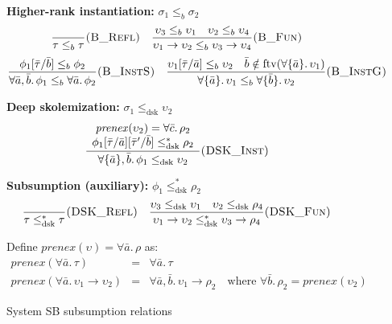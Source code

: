 \documentclass[11pt,a4paper]{article}
\begin{document}
\begin{figure}[p]
\centering
\textbf{Higher-rank instantiation:} $\boxed{\sigma_1 \leq_b \sigma_2}$
\[
\frac{}{\tau \leq_b \tau}\textsc{(B\_Refl)}
\quad
\frac{\upsilon_3 \leq_b \upsilon_1 \quad \upsilon_2 \leq_b \upsilon_4}{\upsilon_1 \to \upsilon_2 \leq_b \upsilon_3 \to \upsilon_4}\textsc{(B\_Fun)}
\]
\[
\frac{\phi_1[\bar{\tau}/\bar{b}] \leq_b \phi_2}{\forall \bar{a}, \bar{b}.\, \phi_1 \leq_b \forall \bar{a}.\, \phi_2}\textsc{(B\_InstS)}
\quad
\frac{\upsilon_1[\bar{\tau}/\bar{a}] \leq_b \upsilon_2 \quad \bar{b} \notin \mathrm{ftv}(\forall\{\bar{a}\}.\, \upsilon_1)}{\forall\{\bar{a}\}.\, \upsilon_1 \leq_b \forall\{\bar{b}\}.\, \upsilon_2}\textsc{(B\_InstG)}
\]

\vspace{1em}
\textbf{Deep skolemization:} $\boxed{\sigma_1 \leq_{\mathrm{dsk}} \upsilon_2}$
\[
\frac{\begin{array}{c}
\mathit{prenex}(\upsilon_2) = \forall \bar{c}.\, \rho_2 \\
\phi_1[\bar{\tau}/\bar{a}][\bar{\tau}'/\bar{b}] \leq_{\mathrm{dsk}}^{*} \rho_2
\end{array}}{\forall\{\bar{a}\}, \bar{b}.\, \phi_1 \leq_{\mathrm{dsk}} \upsilon_2}\textsc{(DSK\_Inst)}
\]

\vspace{0.5em}
\textbf{Subsumption (auxiliary):} $\boxed{\phi_1 \leq_{\mathrm{dsk}}^{*} \rho_2}$
\[
\frac{}{\tau \leq_{\mathrm{dsk}}^{*} \tau}\textsc{(DSK\_Refl)}
\quad
\frac{\upsilon_3 \leq_{\mathrm{dsk}} \upsilon_1 \quad \upsilon_2 \leq_{\mathrm{dsk}} \rho_4}{\upsilon_1 \to \upsilon_2 \leq_{\mathrm{dsk}}^{*} \upsilon_3 \to \rho_4}\textsc{(DSK\_Fun)}
\]

\vspace{0.5em}
Define $\mathit{prenex}(\upsilon) = \forall \bar{a}.\, \rho$ as:
\[
\begin{array}{rcl}
\mathit{prenex}(\forall \bar{a}.\, \tau) & = & \forall \bar{a}.\, \tau \\
\mathit{prenex}(\forall \bar{a}.\, \upsilon_1 \to \upsilon_2) & = & \forall \bar{a}, \bar{b}.\, \upsilon_1 \to \rho_2 \quad \text{where } \forall \bar{b}.\, \rho_2 = \mathit{prenex}(\upsilon_2)
\end{array}
\]
\caption{System SB subsumption relations}
\label{fig:subsumption}
\end{figure}
\end{document}
